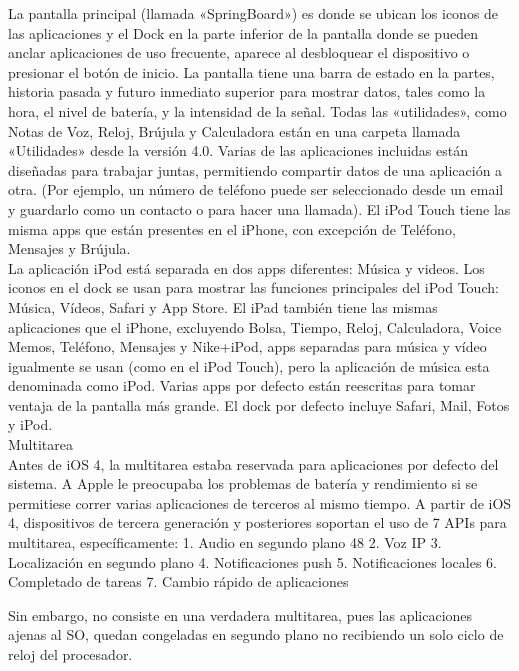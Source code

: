 	La pantalla principal (llamada «SpringBoard») es donde se ubican los iconos de las aplicaciones y el Dock en la parte inferior de la pantalla donde se pueden anclar aplicaciones de uso frecuente, aparece al desbloquear el dispositivo o presionar el botón de inicio. La pantalla tiene una barra de estado en la partes, historia pasada y futuro inmediato superior para mostrar datos, tales como la hora, el nivel de batería, y la intensidad de la señal. Todas las «utilidades», como Notas de Voz, Reloj, Brújula y Calculadora están en una carpeta llamada «Utilidades» desde la versión 4.0. Varias de las aplicaciones incluidas están diseñadas para trabajar juntas, permitiendo compartir datos de una aplicación a otra. (Por ejemplo, un número de teléfono puede ser seleccionado desde un email y guardarlo como un contacto o para hacer una llamada). El iPod Touch tiene las misma apps que están presentes en el iPhone, con excepción de Teléfono, Mensajes y Brújula.\\ 
	
	La aplicación iPod está separada en dos apps diferentes: Música y videos. Los iconos en el dock se usan para mostrar las funciones principales del iPod Touch: Música, Vídeos, Safari y App Store. El iPad también tiene las mismas aplicaciones que el iPhone, excluyendo Bolsa, Tiempo, Reloj, Calculadora, Voice Memos, Teléfono, Mensajes y Nike+iPod, apps separadas para música y vídeo igualmente se usan (como en el iPod Touch), pero la aplicación de música esta denominada como iPod. Varias apps por defecto están reescritas para tomar ventaja de la pantalla más grande. El dock por defecto incluye Safari, Mail, Fotos y iPod.\\
	Multitarea \\
	
	Antes de iOS 4, la multitarea estaba reservada para aplicaciones por defecto del sistema. A Apple le preocupaba los problemas de batería y rendimiento si se permitiese correr varias aplicaciones de terceros al mismo tiempo. A partir de iOS 4, dispositivos de tercera generación y posteriores soportan el uso de 7 APIs para multitarea, específicamente:
	1. Audio en segundo plano 48
	2. Voz IP
	3. Localización en segundo plano
	4. Notificaciones push
	5. Notificaciones locales
	6. Completado de tareas
	7. Cambio rápido de aplicaciones
	
	Sin embargo, no consiste en una verdadera multitarea, pues las aplicaciones ajenas al SO, quedan congeladas en segundo plano no recibiendo un solo ciclo de reloj del procesador.
	
